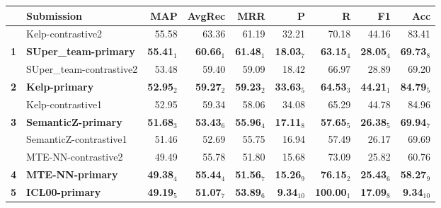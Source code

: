 \begin{table*}[tbh]
\begin{center}
\begin{tabular}{clrrrrrrr}
& \bf Submission & \bf MAP & \bf \scriptsize AvgRec & \bf \scriptsize MRR & \bf \scriptsize P & \bf \scriptsize R & \bf \scriptsize F1 & \bf \scriptsize Acc\\
\hline
& Kelp-contrastive2 & 55.58 & \scriptsize 63.36 & \scriptsize 61.19 & \scriptsize 32.21 & \scriptsize 70.18 & \scriptsize 44.16 & \scriptsize 83.41 \\
\bf 1 & \bf SUper\_team-primary & \bf 55.41$_{1}$ & \bf \scriptsize 60.66$_{1}$ & \bf \scriptsize 61.48$_{1}$ & \bf \scriptsize 18.03$_{7}$ & \bf \scriptsize 63.15$_{4}$ & \bf \scriptsize 28.05$_{4}$ & \bf \scriptsize 69.73$_{8}$ \\
& SUper\_team-contrastive2 & 53.48 & \scriptsize 59.40 & \scriptsize 59.09 & \scriptsize 18.42 & \scriptsize 66.97 & \scriptsize 28.89 & \scriptsize 69.20 \\
\bf 2 & \bf Kelp-primary & \bf 52.95$_{2}$ & \bf \scriptsize 59.27$_{2}$ & \bf \scriptsize 59.23$_{2}$ & \bf \scriptsize 33.63$_{5}$ & \bf \scriptsize 64.53$_{3}$ & \bf \scriptsize 44.21$_{1}$ & \bf \scriptsize 84.79$_{5}$ \\
& Kelp-contrastive1 & 52.95 & \scriptsize 59.34 & \scriptsize 58.06 & \scriptsize 34.08 & \scriptsize 65.29 & \scriptsize 44.78 & \scriptsize 84.96 \\
\bf 3 & \bf SemanticZ-primary & \bf 51.68$_{3}$ & \bf \scriptsize 53.43$_{6}$ & \bf \scriptsize 55.96$_{4}$ & \bf \scriptsize 17.11$_{8}$ & \bf \scriptsize 57.65$_{5}$ & \bf \scriptsize 26.38$_{5}$ & \bf \scriptsize 69.94$_{7}$ \\
& SemanticZ-contrastive1 & 51.46 & \scriptsize 52.69 & \scriptsize 55.75 & \scriptsize 16.94 & \scriptsize 57.49 & \scriptsize 26.17 & \scriptsize 69.69 \\
& MTE-NN-contrastive2 & 49.49 & \scriptsize 55.78 & \scriptsize 51.80 & \scriptsize 15.68 & \scriptsize 73.09 & \scriptsize 25.82 & \scriptsize 60.76 \\
\bf 4 & \bf MTE-NN-primary & \bf 49.38$_{4}$ & \bf \scriptsize 55.44$_{4}$ & \bf \scriptsize 51.56$_{7}$ & \bf \scriptsize 15.26$_{9}$ & \bf \scriptsize 76.15$_{2}$ & \bf \scriptsize 25.43$_{6}$ & \bf \scriptsize 58.27$_{9}$ \\
\bf 5 & \bf ICL00-primary & \bf 49.19$_{5}$ & \bf \scriptsize 51.07$_{7}$ & \bf \scriptsize 53.89$_{6}$ & \bf \scriptsize  9.34$_{10}$ & \bf \scriptsize 100.00$_{1}$ & \bf \scriptsize 17.09$_{8}$ & \bf \scriptsize  9.34$_{10}$ \\

\end{tabular}
\end{center}
\end{table*}
